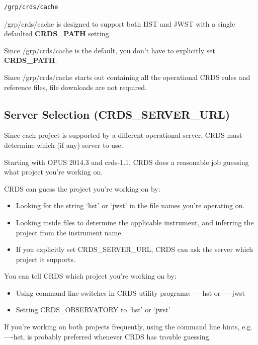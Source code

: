 \documentclass[letterpaper,10pt,english]{sphinxmanual}
\begin{document}
\begin{Verbatim}[commandchars=\\\{\}]
/grp/crds/cache
\end{Verbatim}

/grp/crds/cache is designed to support both HST and JWST with a single defaulted \textbf{CRDS\_PATH} setting.

Since /grp/crds/cache is the default,  you don't have to explicitly set \textbf{CRDS\_PATH}.

Since /grp/crds/cache starts out containing all the operational CRDS rules and reference files, file downloads
are not required.


\subsection{Server Selection (CRDS\_SERVER\_URL)}
\label{installation:server-selection-crds-server-url}
Since each project is supported by a different operational server, CRDS must determine which (if any)
server to use.

Starting with OPUS 2014.3 and crds-1.1,  CRDS does a reasonable job guessing what project you're working on.

CRDS can guess the project you're working on by:
\begin{itemize}
\item {} 
Looking for the string `hst' or `jwst' in the file names you're operating on.

\item {} 
Looking inside files to determine the applicable instrument, and inferring the project from the instrument name.

\item {} 
If you explicitly set CRDS\_SERVER\_URL,  CRDS can ask the server which project it supports.

\end{itemize}

You can tell CRDS which project you're working on by:
\begin{itemize}
\item {} 
Using command line switches in CRDS utility programs:  ----hst or ----jwst

\item {} 
Setting CRDS\_OBSERVATORY to `hst' or `jwst'

\end{itemize}

If you're working on both projects frequently,  using the command line hints,  e.g. ----hst,  is probably
preferred whenever CRDS has trouble guessing.
\end{document}
